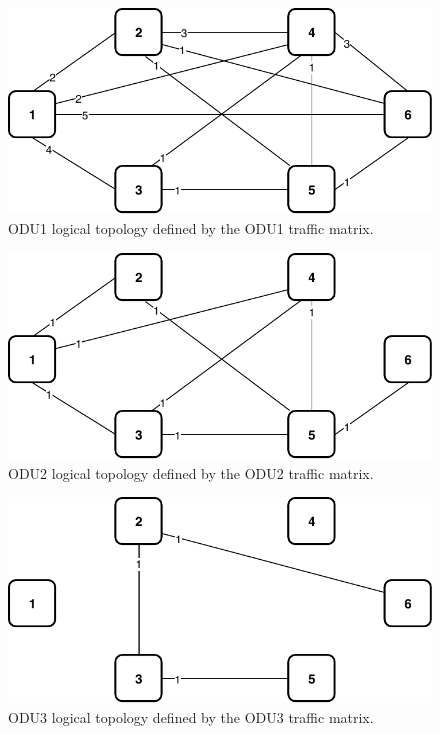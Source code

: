 \begin{figure}[h!]
\centering
\includegraphics[width=12cm]{sdf/ilp/opaque_survivability/figures/logical_topology_ODU1_low}
\caption{ODU1 logical topology defined by the ODU1 traffic matrix.}
\label{logical_ODU1_low}
\end{figure}

\begin{figure}[h!]
\centering
\includegraphics[width=12cm]{sdf/ilp/opaque_survivability/figures/logical_topology_ODU2_low}
\caption{ODU2 logical topology defined by the ODU2 traffic matrix.}
\label{logical_ODU2_low}
\end{figure}

\begin{figure}[h!]
\centering
\includegraphics[width=12cm]{sdf/ilp/opaque_survivability/figures/logical_topology_ODU3_low}
\caption{ODU3 logical topology defined by the ODU3 traffic matrix.}
\label{logical_ODU3_low}
\end{figure}

